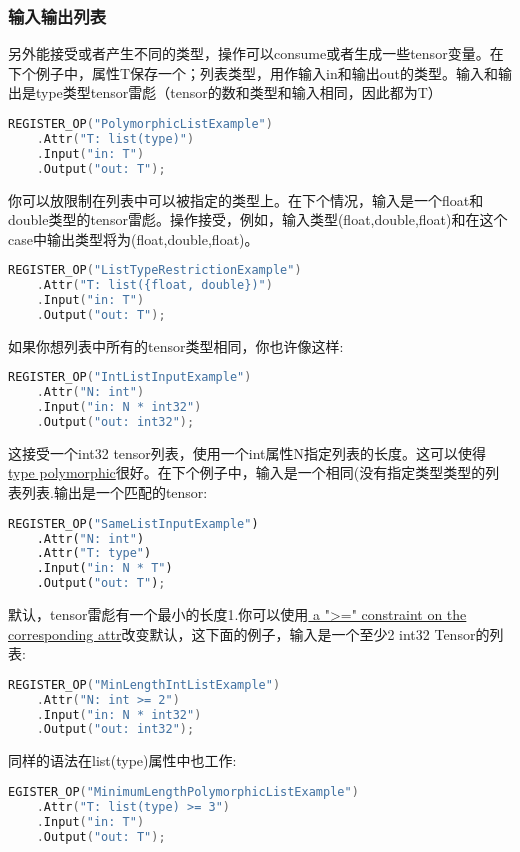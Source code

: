 \subsubsection{输入输出列表}
另外能接受或者产生不同的类型，操作可以consume或者生成一些tensor变量。在下个例子中，属性T保存一个；列表类型，用作输入in和输出out的类型。输入和输出是type类型tensor雷彪（tensor的数和类型和输入相同，因此都为T）
\begin{lstlisting}[language=C++]
REGISTER_OP("PolymorphicListExample")
    .Attr("T: list(type)")
    .Input("in: T")
    .Output("out: T");

\end{lstlisting}
你可以放限制在列表中可以被指定的类型上。在下个情况，输入是一个float和double类型的tensor雷彪。操作接受，例如，输入类型(float,double,float)和在这个case中输出类型将为(float,double,float)。
\begin{lstlisting}[language=C++]
REGISTER_OP("ListTypeRestrictionExample")
    .Attr("T: list({float, double})")
    .Input("in: T")
    .Output("out: T");
\end{lstlisting}
如果你想列表中所有的tensor类型相同，你也许像这样:
\begin{lstlisting}[language=C++]
REGISTER_OP("IntListInputExample")
    .Attr("N: int")
    .Input("in: N * int32")
    .Output("out: int32");

\end{lstlisting}
这接受一个int32 tensor列表，使用一个int属性N指定列表的长度。这可以使得\href{https://www.tensorflow.org/extend/adding_an_op?hl=zh-cn#type_polymorphism}{ type polymorphic}很好。在下个例子中，输入是一个相同(没有指定类型类型的列表列表.输出是一个匹配的tensor:
\begin{lstlisting}[language=Python]
REGISTER_OP("SameListInputExample")
    .Attr("N: int")
    .Attr("T: type")
    .Input("in: N * T")
    .Output("out: T");

\end{lstlisting}
默认，tensor雷彪有一个最小的长度1.你可以使用\href{https://www.tensorflow.org/extend/adding_an_op?hl=zh-cn#default_values_constraints}{ a ">=" constraint on the corresponding attr}改变默认，这下面的例子，输入是一个至少2 int32 Tensor的列表:
\begin{lstlisting}[language=C++]
REGISTER_OP("MinLengthIntListExample")
    .Attr("N: int >= 2")
    .Input("in: N * int32")
    .Output("out: int32");

\end{lstlisting}
同样的语法在list(type)属性中也工作:
\begin{lstlisting}[language=C++]
EGISTER_OP("MinimumLengthPolymorphicListExample")
    .Attr("T: list(type) >= 3")
    .Input("in: T")
    .Output("out: T");

\end{lstlisting}
